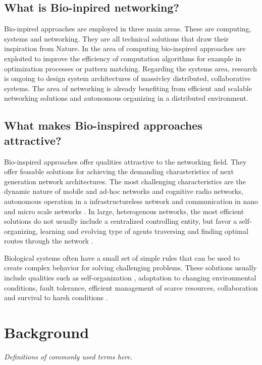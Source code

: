 \documentclass{IWORK2014}
\begin{document}
\subsection{What is Bio-inpired networking?}
Bio-inpired approaches are employed in three main areas. These are computing, systems and networking. They are all technical solutions that draw their inspiration from Nature. In the area of computing bio-inspired approaches are exploited to improve the efficiency of computation algorithms for example in optimization processes or pattern matching. Regarding the systems area, research is ongoing to design system architectures of massivley distributed, collaborative systems. The area of networking is already benefiting from efficient and scalable networking solutions and autonomous organizing in a distributed environment. \cite{dressler2010bio}

\subsection{What makes Bio-inspired approaches attractive?} 
Bio-inspired approaches offer qualities attractive to the networking field. They offer feasable solutions for achieving the demanding charasteristics of next generation network architectures. The most challenging characteristics are the dynamic nature of mobile and ad-hoc networks and cognitive radio networks, autonomous operation in a infrastructureless network and communication in nano and micro scale networks \cite{dressler2010bio}. In large, heterogenous networks, the most efficient solutions do not usually include a centralized controlling entity, but favor a self-organizing, learning and evolving type of agents traversing and finding optimal routes through the network \cite{dressler2010bio}.

Biological systems often have a small set of simple rules that can be used to create complex behavior \cite{dressler2010bio} for solving challenging problems. These solutions usually include qualities such as self-organization \cite{kroeker2011biology}, adaptation to changing environmental conditions, fault tolerance, efficient management of scarce resources, collaboration and survival to harsh conditions \cite{dressler2010bio}.

\section{Background}
\textit{Definitions of commonly used terms here.}
\end{document}
